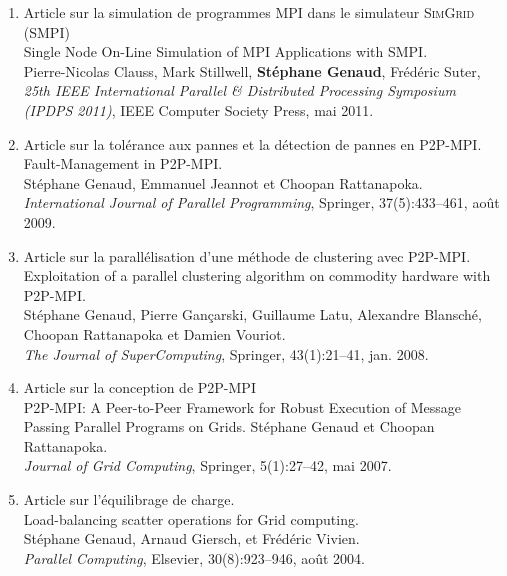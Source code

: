 \documentclass[11pt]{article}
\begin{document}
\vspace{1cm}

\begin{enumerate}
\item Article sur la simulation de programmes MPI dans le simulateur \textsc{SimGrid} (SMPI)\\
Single Node On-Line Simulation of MPI Applications with SMPI.\\
Pierre-Nicolas Clauss, Mark Stillwell, \textbf{Stéphane Genaud}, Fr\'ed\'eric Suter,\\
{\em 25th IEEE International Parallel \& Distributed Processing Symposium (IPDPS 2011)}, 
IEEE Computer Society Press, mai 2011.\\


\item Article sur la tolérance aux pannes et la détection de pannes en P2P-MPI.\\ 
Fault-Management in P2P-MPI.\\
Stéphane Genaud, Emmanuel Jeannot et Choopan Rattanapoka.\\
{\em International Journal of Parallel Programming}, Springer, 37(5):433--461, août 2009.\\


\item Article sur la parallélisation d'une méthode de clustering avec P2P-MPI.\\
Exploitation of a parallel clustering algorithm on commodity hardware with P2P-MPI.\\
Stéphane Genaud, Pierre Gançarski, Guillaume Latu, Alexandre Blansché, Choopan Rattanapoka et Damien Vouriot.\\
{\em The Journal of SuperComputing}, Springer, 43(1):21--41, jan. 2008.\\


\item Article sur la conception de P2P-MPI\\
P2P-MPI: A Peer-to-Peer Framework for Robust Execution of Message Passing Parallel Programs on Grids.
Stéphane Genaud et Choopan Rattanapoka.\\
{\em Journal of Grid Computing}, Springer, 5(1):27--42, mai 2007.\\


\item Article sur l'équilibrage de charge.\\
Load-balancing scatter operations for Grid computing.\\
Stéphane Genaud, Arnaud Giersch, et Frédéric Vivien.\\
{\em Parallel Computing}, Elsevier, 30(8):923--946, août 2004.\\



\end{enumerate}
\end{document}
